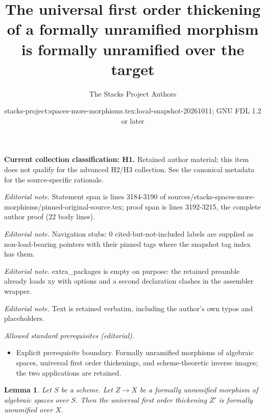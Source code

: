 \documentclass[10pt,a4paper]{amsart}
\title{The universal first order thickening of a formally unramified morphism is formally unramified over the target}
\author{The Stacks Project Authors}
\date{stacks-project:spaces-more-morphisms.tex:local-snapshot-20261011; GNU FDL 1.2 or later}
\theoremstyle{plain}
\newtheorem{lemma}[subsection]{Lemma}
\theoremstyle{definition}
\theoremstyle{remark}
\numberwithin{equation}{subsection}
\begin{document}
\maketitle
\par\medskip\noindent\textbf{Current collection classification: H1.} Retained author material; this item does not qualify for the advanced H2/H3 collection. See the canonical metadata for the source-specific rationale.\par\medskip

\noindent\textit{Editorial note.} Statement span is lines 3184-3190 of sources/stacks-spaces-more-morphisms/pinned-original-source.tex; proof span is lines 3192-3215, the complete author proof (22 body lines).\par\medskip
\noindent\textit{Editorial note.} Navigation stubs: 0 cited-but-not-included labels are supplied as non-load-bearing pointers with their pinned tags where the snapshot tag index has them.\par\medskip
\noindent\textit{Editorial note.} extra\_packages is empty on purpose: the retained preamble already loads xy with options and a second declaration clashes in the assembler wrapper.\par\medskip
\noindent\textit{Editorial note.} Text is retained verbatim, including the author's own typos and placeholders.\par\medskip
\noindent\textit{Allowed standard prerequisites (editorial).}\begin{itemize}
\item Explicit prerequisite boundary. Formally unramified morphisms of algebraic spaces, universal first order thickenings, and scheme-theoretic inverse images; the two applications are retained.
\end{itemize}\medskip
\begin{lemma}
\label{lemma-universal-thickening-unramified}
Let $S$ be a scheme.
Let $Z \to X$ be a formally unramified morphism of algebraic spaces over $S$.
Then the universal first order thickening $Z'$ is formally
unramified over $X$.
\end{lemma}
\end{document}
